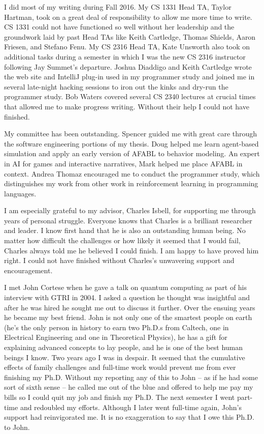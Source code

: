 I did most of my writing during Fall 2016. My CS 1331 Head TA, Taylor Hartman, took on a great deal of responsibility to allow me more time to write. CS 1331 could not have functioned so well without her leadership and the groundwork laid by past Head TAs like Keith Cartledge, Thomas Shields, Aaron Friesen, and Stefano Fenu. My CS 2316 Head TA, Kate Unsworth also took on additional tasks during a semester in which I was the new CS 2316 instructor following Jay Summet's departure. Joshua Diaddigo and Keith Cartledge wrote the web site and IntelliJ plug-in used in my programmer study and joined me in several late-night hacking sessions to iron out the kinks and dry-run the programmer study. Bob Waters covered several CS 2340 lectures at crucial times that allowed me to make progress writing. Without their help I could not have finished.

My committee has been outstanding. Spencer guided me with great care through the software engineering portions of my thesis. Doug helped me learn agent-based simulation and apply an early version of AFABL to behavior modeling. An expert in AI for games and interactive narratives, Mark helped me place AFABL in context. Andrea Thomaz encouraged me to conduct the programmer study, which distinguishes my work from other work in reinforcement learning in programming languages.

\newpage

I am especially grateful to my advisor, Charles Isbell, for supporting me through years of personal struggle. Everyone knows that Charles is a brilliant researcher and leader. I know first hand that he is also an outstanding human being. No matter how difficult the challenges or how likely it seemed that I would fail, Charles always told me he believed I could finish. I am happy to have proved him right. I could not have finished without Charles's unwavering support and encouragement.

I met John Cortese when he gave a talk on quantum computing as part of his interview with GTRI in 2004. I asked a question he thought was insightful and after he was hired he sought me out to discuss it further. Over the ensuing years he became my best friend. John is not only one of the smartest people on earth (he's the only person in history to earn two Ph.D.s from Caltech, one in Electrical Engineering and one in Theoretical Physics), he has a gift for explaining advanced concepts to lay people, and he is one of the best human beings I know. Two years ago I was in despair. It seemed that the cumulative effects of family challenges and full-time work would prevent me from ever finishing my Ph.D. Without my reporting any of this to John -- as if he had some sort of sixth sense -- he called me out of the blue and offered to help me pay my bills so I could quit my job and finish my Ph.D. The next semester I went part-time and redoubled my efforts. Although I later went full-time again, John's support had reinvigorated me. It is no exaggeration to say that I owe this Ph.D. to John.

